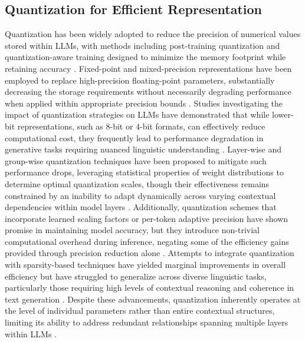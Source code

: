 \subsection{Quantization for Efficient Representation}
Quantization has been widely adopted to reduce the precision of numerical values stored within LLMs, with methods including post-training quantization and quantization-aware training designed to minimize the memory footprint while retaining accuracy \cite{korbanov2024hierarchical}. Fixed-point and mixed-precision representations have been employed to replace high-precision floating-point parameters, substantially decreasing the storage requirements without necessarily degrading performance when applied within appropriate precision bounds \cite{ tokar2024contextual}. Studies investigating the impact of quantization strategies on LLMs have demonstrated that while lower-bit representations, such as 8-bit or 4-bit formats, can effectively reduce computational cost, they frequently lead to performance degradation in generative tasks requiring nuanced linguistic understanding \cite{lodin2024dynamic}. Layer-wise and group-wise quantization techniques have been proposed to mitigate such performance drops, leveraging statistical properties of weight distributions to determine optimal quantization scales, though their effectiveness remains constrained by an inability to adapt dynamically across varying contextual dependencies within model layers \cite{tasba2024hierarchical}. Additionally, quantization schemes that incorporate learned scaling factors or per-token adaptive precision have shown promise in maintaining model accuracy, but they introduce non-trivial computational overhead during inference, negating some of the efficiency gains provided through precision reduction alone \cite{zhao2024comparative}. Attempts to integrate quantization with sparsity-based techniques have yielded marginal improvements in overall efficiency but have struggled to generalize across diverse linguistic tasks, particularly those requiring high levels of contextual reasoning and coherence in text generation \cite{ jatova2024employing}. Despite these advancements, quantization inherently operates at the level of individual parameters rather than entire contextual structures, limiting its ability to address redundant relationships spanning multiple layers within LLMs \cite{hollart2024functional}. 

